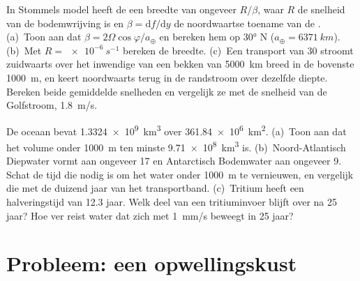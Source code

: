 \begin{exercise}[$\star\star\star$]\label{exo:b1:ocean-circulation:11}
In Stommels model heeft de  een breedte van ongeveer $R/\beta$,
waar $R$ de snelheid van de bodemwrijving is en $\beta = \mathrm df/\mathrm dy$ de noordwaartse toename van de . (a)~Toon aan dat $\beta = 2\Omega
\cos\varphi/a_\oplus$ en bereken hem op \ang{30} N ($a_\oplus = \qty{6371}{km}$). (b)~Met $R = \qty{e-6}{s^{-1}}$ bereken de breedte. (c)~Een transport van
\qty{30}{\sverdrup} stroomt zuidwaarts over het inwendige van een bekken van \qty{5000}{km} breed
in de bovenste \qty{1000}{m}, en keert noordwaarts terug in de randstroom over dezelfde diepte. Bereken beide gemiddelde snelheden en vergelijk ze met de snelheid van de Golfstroom, \qty{1.8}{m/s}.
\end{exercise}

\begin{exercise}[$\star\star\star$]\label{exo:b1:ocean-circulation:12}
De oceaan bevat \qty{1.3324e9}{km^3} over \qty{361.84e6}{km^2}. (a)~Toon aan dat het volume onder \qty{1000}{m} ten minste \qty{9.71e8}{km^3} is. (b)~Noord-Atlantisch Diepwater vormt aan ongeveer \qty{17}{\sverdrup} en Antarctisch Bodemwater aan ongeveer
\qty{9}{\sverdrup}. Schat de tijd die nodig is om het water onder \qty{1000}{m} te vernieuwen, en vergelijk die met de duizend jaar van het transportband. (c)~Tritium heeft een halveringstijd van 12.3 jaar. Welk deel van een tritiuminvoer blijft over na 25 jaar? Hoe ver reist water dat zich met \qty{1}{mm/s} beweegt in 25 jaar?
\end{exercise}

\section{Probleem: een opwellingskust}

